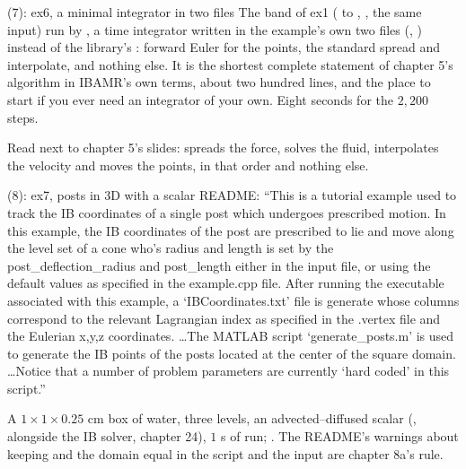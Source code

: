 \documentclass[aspectratio=169,11pt]{beamer}
\begin{document}
\begin{frame}{ (7): ex6, a minimal integrator in two files}
\label{fr:ib67}
\footnotesize {} The band of ex1 ( to , , the same input) run by , a time integrator written in the example's own two files (, ) instead of the library's : forward Euler for the points, the standard spread and interpolate, and nothing else. It is the shortest complete statement of chapter 5's algorithm in IBAMR's own terms, about two hundred lines, and the place to start if you ever need an integrator of your own. Eight seconds for the $2{,}200$ steps.
\vspace{1mm}

\footnotesize Read  next to chapter 5's slides:  spreads the force, solves the fluid, interpolates the velocity and moves the points, in that order and nothing else.
\end{frame}

\begin{frame}{ (8): ex7, posts in 3D with a scalar}
\label{fr:ib7}
\footnotesize {} README: ``This is a tutorial example used to track the IB coordinates of a single post which undergoes prescribed motion. In this example, the IB coordinates of the post are prescribed to lie and move along the level set of a cone who's radius and length is set by the post\_deflection\_radius and post\_length either in the input file, or using the default values as specified in the example.cpp file. After running the executable associated with this example, a `IBCoordinates.txt' file is generate whose columns correspond to the relevant Lagrangian index as specified in the .vertex file and the Eulerian x,y,z coordinates. \ldots The MATLAB script `generate\_posts.m' is used to generate the IB points of the posts located at the center of the square domain. \ldots Notice that a number of problem parameters are currently `hard coded' in this script.''
\vspace{1mm}

\scriptsize A $1\times1\times0.25$ cm box of water, three levels, an advected--diffused scalar (,  alongside the IB solver, chapter 24), $1$ s of run; . The README's warnings about keeping  and the domain equal in the script and the input are chapter 8a's rule.
\end{frame}
\end{document}
